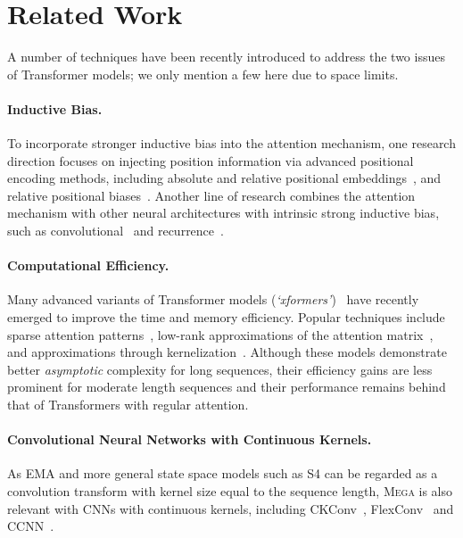 \section{Related Work}

A number of techniques have been recently introduced to address the two issues of Transformer models; we only mention a few here due to space limits.
\paragraph{Inductive Bias.} To incorporate stronger inductive bias into the attention mechanism, one research direction focuses on injecting position information via advanced positional encoding methods, including absolute and relative positional embeddings~\citep{vaswani2017attention,huang2020improve,ke2020rethinking}, and relative positional biases~\citep{su2021roformer,press2021train}. Another line of research combines the attention mechanism with other neural architectures with intrinsic strong inductive bias, such as convolutional~\citep{gehring2017convolutional,dai2021coatnet} and recurrence~\citep{dai2019transformer,rae2020compressive,lei2021attention}.

\paragraph{Computational Efficiency.} Many advanced variants of Transformer models (\emph{`xformers'})~\citep{tay2020efficient,tay2021long} have recently emerged to improve the time and memory efficiency. Popular techniques include sparse attention patterns~\citep{parmar2018image,beltagy2020longformer,kitaev2020reformer}, low-rank approximations of the attention matrix~\citep{wang2020linformer,ma2021luna}, and approximations through kernelization~\citep{choromanski2020rethinking,peng2021random}. Although these models demonstrate better \emph{asymptotic} complexity for long sequences, their efficiency gains are less prominent for moderate length sequences and their performance remains behind that of Transformers with regular attention.

\paragraph{Convolutional Neural Networks with Continuous Kernels.} As EMA and more general state space models such as S4 can be regarded as a convolution transform with kernel size equal to the sequence length, \textsc{Mega} is also relevant with CNNs with continuous kernels, including CKConv~\citep{romero2021ckconv}, FlexConv~\citep{romero2021flexconv} and CCNN~\citep{romero2022towards}.

